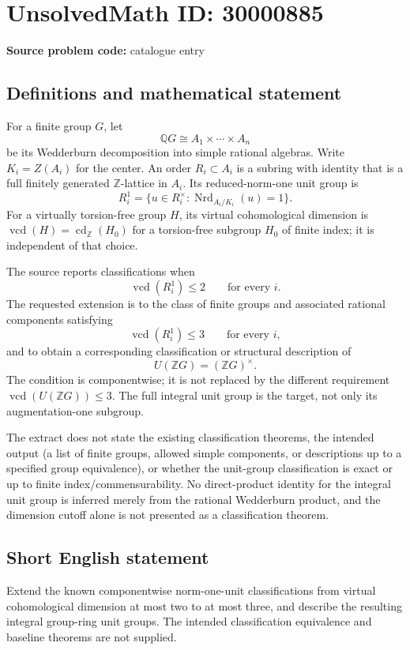 \documentclass[11pt]{article}
\newcommand{\Z}{\mathbb{Z}}
\newcommand{\Q}{\mathbb{Q}}
\begin{document}
\section*{UnsolvedMath ID: 30000885}
\textbf{Source problem code:} catalogue entry
\subsection{Definitions and mathematical statement}
For a finite group $G$, let
\[
\Q G\cong A_1\times\cdots\times A_n
\]
be its Wedderburn decomposition into simple rational algebras. Write $K_i=Z(A_i)$ for the center. An order $R_i\subset A_i$ is a subring with identity that is a full finitely generated $\Z$-lattice in $A_i$. Its reduced-norm-one unit group is
\[
R_i^1=\{u\in R_i^\times:\operatorname{Nrd}_{A_i/K_i}(u)=1\}.
\]
For a virtually torsion-free group $H$, its virtual cohomological dimension is $\operatorname{vcd}(H)=\operatorname{cd}_{\Z}(H_0)$ for a torsion-free subgroup $H_0$ of finite index; it is independent of that choice.

The source reports classifications when
\[
\operatorname{vcd}(R_i^1)\leq2\qquad\text{for every }i.
\]
The requested extension is to the class of finite groups and associated rational components satisfying
\[
\operatorname{vcd}(R_i^1)\leq3\qquad\text{for every }i,
\]
and to obtain a corresponding classification or structural description of
\[
U(\Z G)=(\Z G)^\times.
\]
The condition is componentwise; it is not replaced by the different requirement $\operatorname{vcd}(U(\Z G))\leq3$. The full integral unit group is the target, not only its augmentation-one subgroup.

The extract does not state the existing classification theorems, the intended output (a list of finite groups, allowed simple components, or descriptions up to a specified group equivalence), or whether the unit-group classification is exact or up to finite index/commensurability. No direct-product identity for the integral unit group is inferred merely from the rational Wedderburn product, and the dimension cutoff alone is not presented as a classification theorem.
\subsection{Short English statement}
Extend the known componentwise norm-one-unit classifications from virtual cohomological dimension at most two to at most three, and describe the resulting integral group-ring unit groups. The intended classification equivalence and baseline theorems are not supplied.
\end{document}
